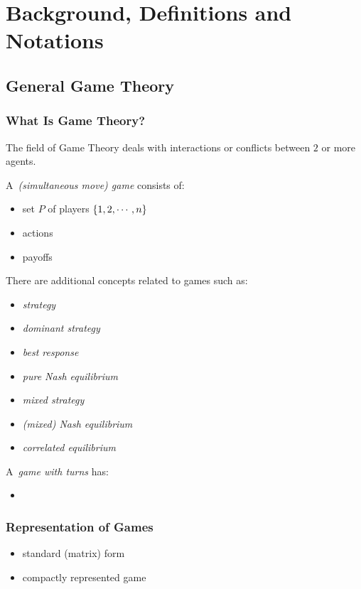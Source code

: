 \chapter{Background, Definitions and Notations}

\section{General Game Theory}

\subsection{What Is Game Theory?}

The field of Game Theory deals with interactions or conflicts between $2$ or more agents.
\todo

A~\emph{(simultaneous move) game} consists of: \todo
\begin{itemize}
  \item set $P$ of players $\left\{ 1, 2, \cdots, n \right\}$
  \item actions
  \item payoffs
\end{itemize}

There are additional concepts related to games such as: \todo
\begin{itemize}
  \item \emph{strategy}
  \item \emph{dominant strategy}
  \item \emph{best response}
  \item \emph{pure Nash equilibrium}
  \item \emph{mixed strategy}
  \item \emph{(mixed) Nash equilibrium}
  \item \emph{correlated equilibrium}
\end{itemize}

A~\emph{game with turns} has:
\begin{itemize}
  \item \todo
\end{itemize}

\subsection{Representation of Games}

\todo
\begin{itemize}
  \item standard (matrix) form
  \item compactly represented game
\end{itemize}

